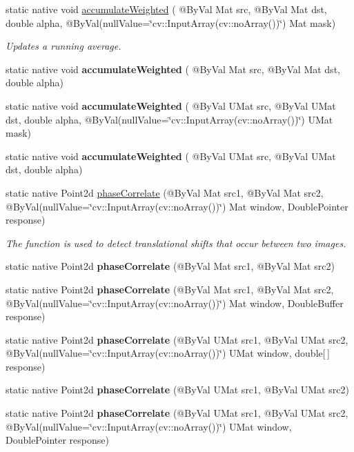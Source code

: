 \begin{DoxyCompactItemize}
\item 
static native void \hyperlink{group__imgproc__motion_gaa66187536d891c9d8ceacafa73d2d247}{accumulate\+Weighted} ( @By\+Val Mat src, @By\+Val Mat dst, double alpha, @By\+Val(null\+Value=\char`\"{}cv\+::\+Input\+Array(cv\+::no\+Array())\char`\"{}) Mat mask)
\begin{DoxyCompactList}\small\item\em Updates a running average. \end{DoxyCompactList}\item 
static native void {\bfseries accumulate\+Weighted} ( @By\+Val Mat src, @By\+Val Mat dst, double alpha)
\item 
static native void {\bfseries accumulate\+Weighted} ( @By\+Val U\+Mat src, @By\+Val U\+Mat dst, double alpha, @By\+Val(null\+Value=\char`\"{}cv\+::\+Input\+Array(cv\+::no\+Array())\char`\"{}) U\+Mat mask)
\item 
static native void {\bfseries accumulate\+Weighted} ( @By\+Val U\+Mat src, @By\+Val U\+Mat dst, double alpha)
\item 
static native Point2d \hyperlink{group__imgproc__motion_gaa6db080ff5a1fc47bf09771158c47abb}{phase\+Correlate} (@By\+Val Mat src1, @By\+Val Mat src2, @By\+Val(null\+Value=\char`\"{}cv\+::\+Input\+Array(cv\+::no\+Array())\char`\"{}) Mat window, Double\+Pointer response)
\begin{DoxyCompactList}\small\item\em The function is used to detect translational shifts that occur between two images. \end{DoxyCompactList}\item 
static native Point2d {\bfseries phase\+Correlate} (@By\+Val Mat src1, @By\+Val Mat src2)
\item 
static native Point2d {\bfseries phase\+Correlate} (@By\+Val Mat src1, @By\+Val Mat src2, @By\+Val(null\+Value=\char`\"{}cv\+::\+Input\+Array(cv\+::no\+Array())\char`\"{}) Mat window, Double\+Buffer response)
\item 
static native Point2d {\bfseries phase\+Correlate} (@By\+Val U\+Mat src1, @By\+Val U\+Mat src2, @By\+Val(null\+Value=\char`\"{}cv\+::\+Input\+Array(cv\+::no\+Array())\char`\"{}) U\+Mat window, double\mbox{[}$\,$\mbox{]} response)
\item 
static native Point2d {\bfseries phase\+Correlate} (@By\+Val U\+Mat src1, @By\+Val U\+Mat src2)
\item 
static native Point2d {\bfseries phase\+Correlate} (@By\+Val U\+Mat src1, @By\+Val U\+Mat src2, @By\+Val(null\+Value=\char`\"{}cv\+::\+Input\+Array(cv\+::no\+Array())\char`\"{}) U\+Mat window, Double\+Pointer response)

\end{DoxyCompactItemize}
